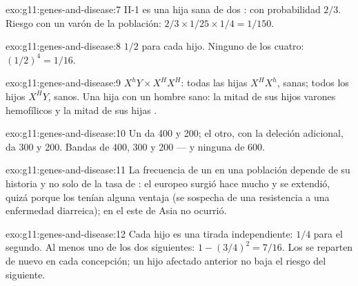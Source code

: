 \begin{solution}{exo:g11:genes-and-disease:7}
II-1 es una hija sana de dos :  con probabilidad
$2/3$. Riesgo con un varón de la población: $2/3 \times 1/25 \times 1/4
= 1/150$.
\end{solution}

\begin{solution}{exo:g11:genes-and-disease:8}
$1/2$ para cada hijo. Ninguno de los cuatro: $(1/2)^4 = 1/16$.
\end{solution}

\begin{solution}{exo:g11:genes-and-disease:9}
$X^hY \times X^HX^H$: todas las hijas $X^HX^h$,  sanas; todos
los hijos $X^HY$, sanos. Una hija  con un hombre sano: la
mitad de sus hijos varones hemofílicos y la mitad de sus hijas
.
\end{solution}

\begin{solution}{exo:g11:genes-and-disease:10}
Un  da 400 y 200; el otro, con la deleción adicional, da 300 y
200. Bandas de 400, 300 y 200 --- y ninguna de 600.
\end{solution}

\begin{solution}{exo:g11:genes-and-disease:11}
La frecuencia de un  en una población depende de su historia y no
solo de la tasa de : el  europeo surgió hace mucho y se
extendió, quizá porque los  tenían alguna ventaja (se
sospecha de una resistencia a una enfermedad diarreica); en el este de
Asia no ocurrió.
\end{solution}

\begin{solution}{exo:g11:genes-and-disease:12}
Cada hijo es una tirada independiente: $1/4$ para el segundo. Al menos
uno de los dos siguientes: $1 - (3/4)^2 = 7/16$. Los  se reparten
de nuevo en cada concepción; un hijo afectado anterior no baja el
riesgo del siguiente.
\end{solution}

